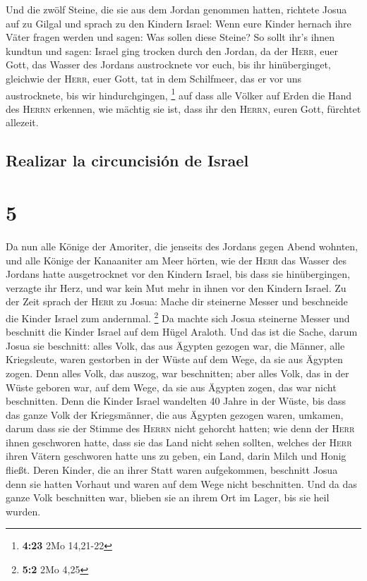  Und die zwölf Steine, die sie aus dem Jordan genommen
hatten, richtete Josua auf zu Gilgal  und sprach zu den
Kindern Israel: Wenn eure Kinder hernach ihre Väter fragen werden und
sagen: Was sollen diese Steine?  So sollt ihr's ihnen
kundtun und sagen: Israel ging trocken durch den Jordan, 
da der \textsc{Herr}, euer Gott, das Wasser des Jordans austrocknete vor
euch, bis ihr hinüberginget, gleichwie der \textsc{Herr}, euer Gott, tat
in dem Schilfmeer, das er vor uns austrocknete, bis wir hindurchgingen,
\footnote{\textbf{4:23} 2Mo 14,21-22}  auf dass alle
Völker auf Erden die Hand des \textsc{Herrn} erkennen, wie mächtig sie
ist, dass ihr den \textsc{Herrn}, euren Gott, fürchtet allezeit.

\hypertarget{realizar-la-circuncisiuxf3n-de-israel}{%
\subsection{Realizar la circuncisión de
Israel}\label{realizar-la-circuncisiuxf3n-de-israel}}

\hypertarget{section-4}{%
\section{5}\label{section-4}}

 Da nun alle Könige der Amoriter, die jenseits des Jordans
gegen Abend wohnten, und alle Könige der Kanaaniter am Meer hörten, wie
der \textsc{Herr} das Wasser des Jordans hatte ausgetrocknet vor den
Kindern Israel, bis dass sie hinübergingen, verzagte ihr Herz, und war
kein Mut mehr in ihnen vor den Kindern Israel.  Zu der
Zeit sprach der \textsc{Herr} zu Josua: Mache dir steinerne Messer und
beschneide die Kinder Israel zum andernmal. \footnote{\textbf{5:2} 2Mo
  4,25}  Da machte sich Josua steinerne Messer und
beschnitt die Kinder Israel auf dem Hügel Araloth.  Und
das ist die Sache, darum Josua sie beschnitt: alles Volk, das aus
Ägypten gezogen war, die Männer, alle Kriegsleute, waren gestorben in
der Wüste auf dem Wege, da sie aus Ägypten zogen.  Denn
alles Volk, das auszog, war beschnitten; aber alles Volk, das in der
Wüste geboren war, auf dem Wege, da sie aus Ägypten zogen, das war nicht
beschnitten.  Denn die Kinder Israel wandelten 40 Jahre in
der Wüste, bis dass das ganze Volk der Kriegsmänner, die aus Ägypten
gezogen waren, umkamen, darum dass sie der Stimme des \textsc{Herrn}
nicht gehorcht hatten; wie denn der \textsc{Herr} ihnen geschworen
hatte, dass sie das Land nicht sehen sollten, welches der \textsc{Herr}
ihren Vätern geschworen hatte uns zu geben, ein Land, darin Milch und
Honig fließt.  Deren Kinder, die an ihrer Statt waren
aufgekommen, beschnitt Josua denn sie hatten Vorhaut und waren auf dem
Wege nicht beschnitten.  Und da das ganze Volk beschnitten
war, blieben sie an ihrem Ort im Lager, bis sie heil wurden.

